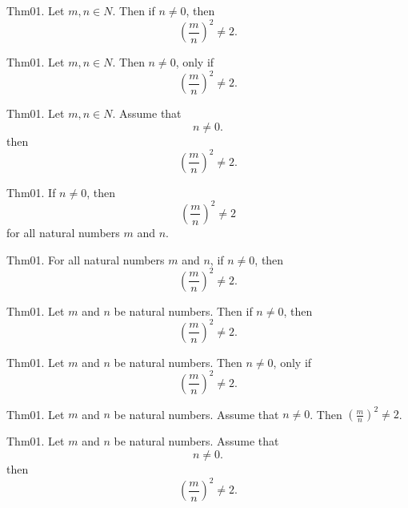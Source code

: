 \documentclass{article}
\begin{document}
\newcommand{\meets}{\mathrel{\supset\!\!\!\subset}}
\newcommand{\notmeets}{\mathrel{\not\meets}}

Thm01. Let $m , n \in N$. Then if $n \neq 0$, then $$(\frac{ m}{n})^ {2}\neq 2.$$

Thm01. Let $m , n \in N$. Then $n \neq 0$, only if $$(\frac{ m}{n})^ {2}\neq 2.$$

Thm01. Let $m , n \in N$. Assume that $$n \neq 0.$$ then $$(\frac{ m}{n})^ {2}\neq 2.$$

Thm01. If $n \neq 0$, then $$(\frac{ m}{n})^ {2}\neq 2$$ for all natural numbers $m$ and $n$.

Thm01. For all natural numbers $m$ and $n$, if $n \neq 0$, then $$(\frac{ m}{n})^ {2}\neq 2.$$

Thm01. Let $m$ and $n$ be natural numbers. Then if $n \neq 0$, then $$(\frac{ m}{n})^ {2}\neq 2.$$

Thm01. Let $m$ and $n$ be natural numbers. Then $n \neq 0$, only if $$(\frac{ m}{n})^ {2}\neq 2.$$

Thm01. Let $m$ and $n$ be natural numbers. Assume that $n \neq 0$. Then $(\frac{ m}{n})^ {2}\neq 2$.

Thm01. Let $m$ and $n$ be natural numbers. Assume that $$n \neq 0.$$ then $$(\frac{ m}{n})^ {2}\neq 2.$$
\end{document}
